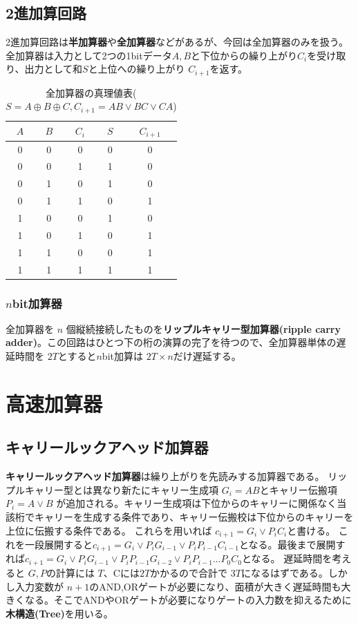 \documentclass[a4j,10pt,oneside,openany,fleqn]{jsbook}
\begin{document}
\subsection{2進加算回路}
2進加算回路は\textbf{半加算器}や\textbf{全加算器}などがあるが、今回は全加算器のみを扱う。全加算器は入力として2つの1bitデータ$A,B$と下位からの繰り上がり$C_i$を受け取り、出力として和$S$と上位への繰り上がり $C_{i+1}$を返す。

\begin{table}[htb]
  \begin{center}
    \begin{tabular}{ccc|cc} 
      $A$ & $B$ & $C_i$ & $S$ & $C_{i+1}$ \\ \hline
      0 & 0 & 0 & 0 & 0\\
      0 & 0 & 1 & 1 & 0\\
      0 & 1 & 0 & 1 & 0\\
      0 & 1 & 1 & 0 & 1\\
      1 & 0 & 0 & 1 & 0\\
      1 & 0 & 1 & 0 & 1\\
      1 & 1 & 0 & 0 & 1\\
      1 & 1 & 1 & 1 & 1\\
    \end{tabular}
  \end{center}
  \caption{全加算器の真理値表($S=A \oplus B \oplus C, C_{i+1} = AB \vee BC \vee CA$)}
\end{table}


\subsubsection{$n$bit加算器}
全加算器を $n$ 個縦続接続したものを\textbf{リップルキャリー型加算器(ripple carry adder)}。この回路はひとつ下の桁の演算の完了を待つので、全加算器単体の遅延時間を $2T$とすると$n$bit加算は $2T \times n$だけ遅延する。

\section{高速加算器}
\subsection{キャリールックアヘッド加算器}
\textbf{キャリールックアヘッド加算器}は繰り上がりを先読みする加算器である。
リップルキャリー型とは異なり新たにキャリー生成項 $G_i = AB$とキャリー伝搬項 $P_i = A \vee B$ が追加される。キャリー生成項は下位からのキャリーに関係なく当該桁でキャリーを生成する条件であり、キャリー伝搬校は下位からのキャリーを上位に伝搬する条件である。
これらを用いれば $c_{i+1} = G_i \vee P_i C_i$と書ける。
これを一段展開すると$c_{i+1} = G_i \vee P_i G_{i-1} \vee P_iP_{i-1}C_{i-1}$となる。最後まで展開すれば$c_{i+1} = G_i \vee P_i G_{i-1} \vee P_iP_{i-1}G_{i-2}\vee P_iP_{i-1} \dots P_0 C_0$となる。
遅延時間を考えると $G,P$の計算には $T$、Cには$2T$かかるので合計で $3T$になるはずである。しかし入力変数が $n+1$のAND,ORゲートが必要になり、面積が大きく遅延時間も大きくなる。そこでANDやORゲートが必要になりゲートの入力数を抑えるために\textbf{木構造(Tree)}を用いる。
\end{document}
